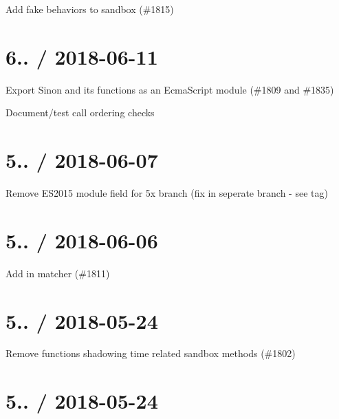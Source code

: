 \begin{DoxyItemize}
\item Add fake behaviors to sandbox (\#1815)
\end{DoxyItemize}

\section*{6.. / 2018-\/06-\/11 }


\begin{DoxyItemize}
\item Export Sinon and its functions as an Ecma\+Script module (\#1809 and \#1835)
\item Document/test call ordering checks
\end{DoxyItemize}

\section*{5.. / 2018-\/06-\/07 }


\begin{DoxyItemize}
\item Remove E\+S2015 \textquotesingle{}module\textquotesingle{} field for 5x branch (fix in seperate branch -\/ see tag)
\end{DoxyItemize}

\section*{5.. / 2018-\/06-\/06 }


\begin{DoxyItemize}
\item Add {\ttfamily in} matcher (\#1811)
\end{DoxyItemize}

\section*{5.. / 2018-\/05-\/24 }


\begin{DoxyItemize}
\item Remove functions shadowing time related sandbox methods (\#1802)
\end{DoxyItemize}

\section*{5.. / 2018-\/05-\/24 }


